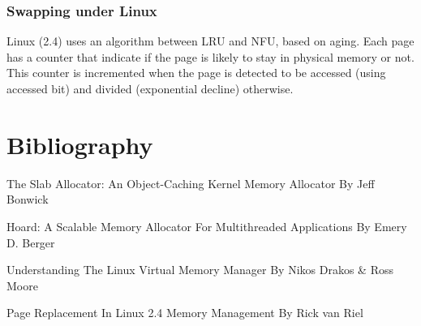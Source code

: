 
\begin{frame}
  \frametitle{Swapping under Linux}

  Linux (2.4) uses an algorithm between LRU and NFU, based on aging. Each page has a
  counter that indicate if the page is likely to stay in physical
  memory or not. This counter is incremented when the page is detected
  to be accessed (using accessed bit) and divided (exponential
  decline) otherwise.

\end{frame}

%
%

\section{Bibliography}

\begin{thebibliography}{4}

The Slab Allocator: An Object-Caching Kernel Memory Allocator
\newblock By Jeff Bonwick

Hoard: A Scalable Memory Allocator For Multithreaded Applications
\newblock By Emery D. Berger

Understanding The Linux Virtual Memory Manager
\newblock By Nikos Drakos \& Ross Moore

Page Replacement In Linux 2.4 Memory Management
\newblock By Rick van Riel

\end{thebibliography}


